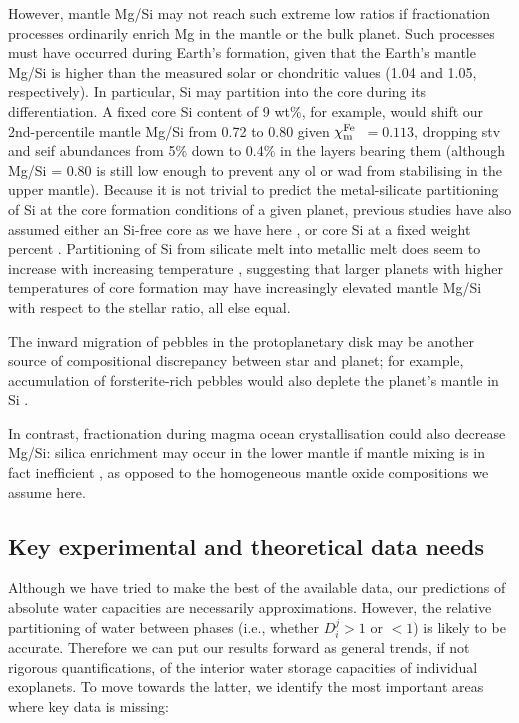 \documentclass[fleqn,usenatbib]{mnras}
\newcommand{\coreeff}{$\chi^{\rm Fe}_{\rm m}$}
\begin{document}
However, mantle Mg/Si may not reach such extreme low ratios if fractionation processes ordinarily enrich Mg in the mantle or the bulk planet. Such processes must have occurred during Earth's formation, given that the Earth's mantle Mg/Si \citep[1.25;][]{mcdonough_composition_1995} is higher than the measured solar or chondritic values (1.04 and 1.05, respectively). In particular, Si may partition into the core during its differentiation. A fixed core Si content of 9 wt\%, for example, would shift our 2nd-percentile mantle Mg/Si from 0.72 to 0.80 given \coreeff~$ =0.113$, dropping stv and seif abundances from 5\% down to 0.4\% in the layers bearing them (although Mg/Si = 0.80 is still low enough to prevent any ol or wad from stabilising in the upper mantle). Because it is not trivial to predict the metal-silicate partitioning of Si at the core formation conditions of a given planet, previous studies have also assumed either an Si-free core as we have here \citep[e.g.,][]{dorn_can_2015,dorn_generalized_2017, dorn_interior_2018, hinkel_starplanet_2018, wang_enhanced_2019, unterborn_pressure_2019, spaargaren_influence_2020, otegi_impact_2020}, or core Si at a fixed weight percent \citep{unterborn_scaling_2016, spaargaren_compositional_2021}. Partitioning of Si from silicate melt into metallic melt does seem to increase with increasing temperature \citep{fischer_high_2015}, suggesting that larger planets with higher temperatures of core formation may have increasingly elevated mantle Mg/Si with respect to the stellar ratio, all else equal. 

The inward migration of pebbles in the protoplanetary disk may be another source of compositional discrepancy between star and planet; for example, accumulation of forsterite-rich pebbles would also deplete the planet's mantle in Si \citep{miyazaki_dynamic_2020}. 

In contrast, fractionation during magma ocean crystallisation could also decrease Mg/Si: silica enrichment may occur in the lower mantle if mantle mixing is in fact inefficient \citep{ballmer_persistence_2017}, as opposed to the homogeneous mantle oxide compositions we assume here.



\subsection{Key experimental and theoretical data needs}

Although we have tried to make the best of the available data, our predictions of absolute water capacities are necessarily approximations. However, the relative partitioning of water between phases (i.e., whether $D^j_i >1$ or $<1$) is likely to be accurate. Therefore we can put our results forward as general trends, if not rigorous quantifications, of the interior water storage capacities of individual exoplanets. To move towards the latter, we identify the most important areas where key data is missing:
\end{document}
